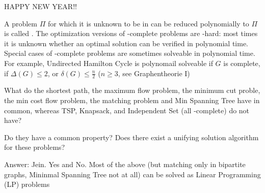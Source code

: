 \begin{lec}[2012-01-09]\end{lec}

HAPPY NEW YEAR!!

\begin{defn}
	A problem $\Pi$ for which it is unknown to be in \npoly can be reduced polynomially to $\Pi$ is called . The optimization versions of \npoly-complete problems are \npoly-hard: most times it is unknown whether an optimal solution can be verified in polynomial time.
	Special cases of \npoly-complete problems are sometimes solveable in polynomial time. For example, Undirected Hamilton Cycle is polynomail solveable if $G$ is complete, if $\Delta(G) \leq 2$, or $\delta(G) \leq \frac n2$ ($n\geq 3$, see Graphentheorie I)

	What do the shortest path, the maximum flow problem, the minimum cut proble, the min cost flow problem, the matching problem and Min Spanning Tree have in common, whereas TSP, Knapsack, and Independent Set (all \npoly-complete) do not have?

	\begin{qstn}
		Do they have a common property? Does there exist a unifying solution algorithm for these problems?
	\end{qstn}

	Answer: Jein. Yes and No. Most of the above (but matching only in bipartite graphs, Mininmal Spanning Tree not at all) can be solved as Linear Programming (LP) problems
\end{defn}

